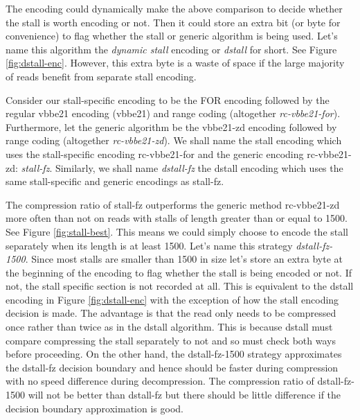 

The encoding could dynamically make the above comparison to decide
whether the stall is worth encoding or not. Then it could store an extra bit (or
byte for convenience) to flag whether the stall or generic algorithm is being
used. Let's name this algorithm the \textit{dynamic stall} encoding or
\textit{dstall} for short. See Figure \ref{fig:dstall-enc}. However, this extra
byte is a waste of space if the large majority of reads benefit from separate
stall encoding.



Consider our stall-specific encoding to be the FOR encoding followed by the
regular vbbe21 encoding (vbbe21) and range coding (altogether
\textit{rc-vbbe21-for}). Furthermore, let the generic algorithm be the
vbbe21-zd encoding followed by range coding (altogether
\textit{rc-vbbe21-zd}).
We shall name the stall encoding which uses the stall-specific encoding
rc-vbbe21-for and the generic encoding rc-vbbe21-zd: \textit{stall-fz}.
Similarly, we shall name \textit{dstall-fz} the dstall encoding which uses the
same stall-specific and generic encodings as stall-fz.

The compression ratio of stall-fz outperforms the generic method rc-vbbe21-zd
more often than not on reads with stalls of length greater than or equal to
1500. See Figure
\ref{fig:stall-best}. This means we could simply choose to encode the stall
separately when its length is at least 1500. Let's name this strategy
\textit{dstall-fz-1500}. Since most stalls are smaller than
1500 in size let's store an extra byte at the beginning of the encoding to flag
whether the stall is being encoded or not. If not, the stall specific section is
not recorded at all. This is equivalent to the dstall encoding in Figure
\ref{fig:dstall-enc} with the exception of how the stall encoding decision is
made. The advantage is that the read only needs to be compressed once rather
than twice as in the dstall algorithm. This is because dstall must compare
compressing the stall separately to not and so must check both ways before
proceeding. On the other hand, the dstall-fz-1500 strategy approximates the
dstall-fz decision boundary and hence should be faster during compression with
no speed difference during decompression. The compression ratio of
dstall-fz-1500 will not be better than dstall-fz but there should be little
difference if the decision boundary approximation is good.

%


